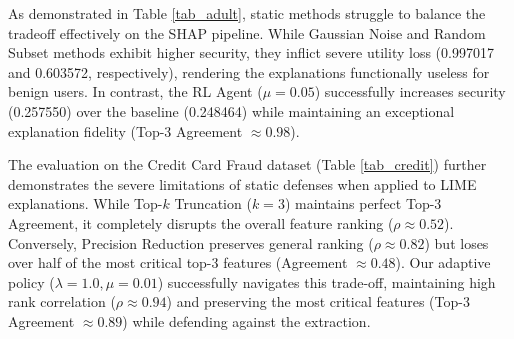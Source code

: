 \documentclass[conference]{IEEEtran}
\begin{document}
\begin{table}[htbp]
\caption{Security vs. Distortion Trade-off: Credit Card Fraud Dataset (DNN + LIME)}
\begin{center}
\label{tab_credit}
\end{center}
\end{table}

As demonstrated in Table \ref{tab_adult}, static methods struggle to balance the tradeoff effectively on the SHAP pipeline. While Gaussian Noise and Random Subset methods exhibit higher security, they inflict severe utility loss (0.997017 and 0.603572, respectively), rendering the explanations functionally useless for benign users. In contrast, the RL Agent ($\mu=0.05$) successfully increases security (0.257550) over the baseline (0.248464) while maintaining an exceptional explanation fidelity (Top-3 Agreement $\approx 0.98$).

The evaluation on the Credit Card Fraud dataset (Table \ref{tab_credit}) further demonstrates the severe limitations of static defenses when applied to LIME explanations. While Top-$k$ Truncation ($k=3$) maintains perfect Top-3 Agreement, it completely disrupts the overall feature ranking ($\rho \approx 0.52$). Conversely, Precision Reduction preserves general ranking ($\rho \approx 0.82$) but loses over half of the most critical top-3 features (Agreement $\approx 0.48$). Our adaptive policy ($\lambda=1.0, \mu=0.01$) successfully navigates this trade-off, maintaining high rank correlation ($\rho \approx 0.94$) and preserving the most critical features (Top-3 Agreement $\approx 0.89$) while defending against the extraction.
\end{document}
